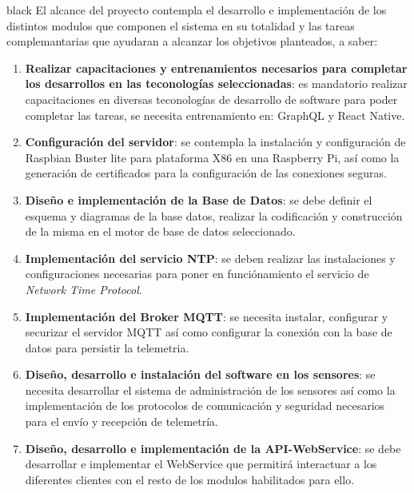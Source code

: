 \documentclass[11pt]{charter}
\begin{document}
\begin{consigna}{black}
%
%
%
El alcance del proyecto contempla el desarrollo e implementación de los distintos modulos que componen el sistema en su totalidad y las tareas complemantarias que ayudaran a alcanzar los objetivos planteados, a saber:

\begin{enumerate}
	\item \textbf{Realizar capacitaciones y entrenamientos necesarios para completar los desarrollos en las teconologías seleccionadas}: es mandatorio realizar capacitaciones en diversas teconologías de desarrollo de software para poder completar las tareas, se necesita entrenamiento en: GraphQL y React Native.
	\item \textbf{Configuración del servidor}: se contempla la instalación y configuración de Raspbian Buster lite para plataforma X86 en una Raspberry Pi, así como la generación de certificados para la configuración de las conexiones seguras.	
	\item \textbf{Diseño e implementación de la Base de Datos}: se debe definir el esquema y diagramas de la base datos, realizar la codificación y construcción de la misma en el motor de base de datos seleccionado.
	\item \textbf{Implementación del servicio NTP}: se deben realizar las instalaciones y configuraciones necesarias para poner en funciónamiento el servicio de \textit{Network Time Protocol}.
	\item \textbf{Implementación del Broker MQTT}: se necesita instalar, configurar y securizar el servidor MQTT así como configurar la conexión con la base de datos para persistir la telemetria.
	\item \textbf{Diseño, desarrollo e instalación del software en los sensores}: se necesita desarrollar el sistema de administración de los sensores así como la implementación de los protocolos de comunicación y seguridad necesarios para el envío y recepción de telemetría.
	\item \textbf{Diseño, desarrollo e implementación de la API-WebService}: se debe desarrollar e implementar el WebService que permitirá interactuar a los diferentes clientes con el resto de los modulos habilitados para ello.

\end{enumerate}
\end{consigna}
\end{document}
